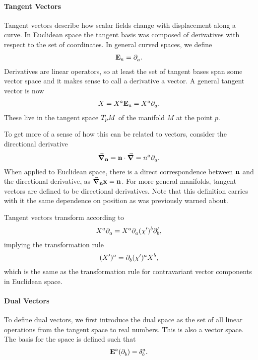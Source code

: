 \paragraph{Tangent Vectors}
Tangent vectors describe how scalar fields change with displacement along a curve. In Euclidean space the tangent basis was composed of derivatives with respect to the set of coordinates. In general curved spaces, we define
\begin{align*}
\tb{a} = \del{a}{}.
\end{align*}
Derivatives are linear operators, so at least the set of tangent bases span some vector space and it makes sense to call a derivative a vector. A general tangent vector is now
\begin{align*}
X = X^{a}\tb{a} = X^{a}\del{a}{}.
\end{align*}
These live in the tangent space $\ts{p}{M}$ of the manifold $M$ at the point $p$.

To get more of a sense of how this can be related to vectors, consider the directional derivative
\begin{align*}
\grad_{\vb{n}} = \vb{n}\cdot\grad = n^{a}\del{a}{}.
\end{align*}
When applied to Euclidean space, there is a direct correspondence between $\vb{n}$ and the directional derivative, as $\grad_{\vb{n}}{\vb{x}} = \vb{n}$. For more general manifolds, tangent vectors are defined to be directional derivatives. Note that this definition carries with it the same dependence on position as was previously warned about.

Tangent vectors transform according to
\begin{align*}
X^{a}\del{a}{} = X^{a}\del{a}{(\chi^{\prime})^{b}}\del[\prime]{b}{},
\end{align*}
implying the transformation rule
\begin{align*}
(X^{\prime})^{a} = \del{b}{(\chi^{\prime})^{a}}X^{b},
\end{align*}
which is the same as the transformation rule for contravariant vector components in Euclidean space.

\paragraph{Dual Vectors}
To define dual vectors, we first introduce the dual space as the set of all linear operations from the tangent space to real numbers. This is also a vector space. The basis for the space is defined such that
\begin{align*}
\db{a}(\del{b}{}) = \kdelta{b}{a}.
\end{align*}

